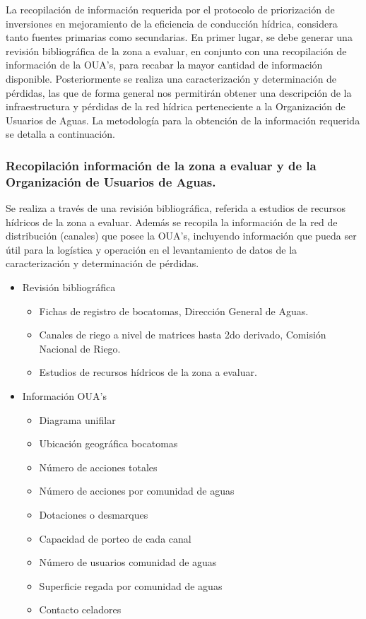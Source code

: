 \documentclass[]{article}
\begin{document}
La recopilación de información requerida por el protocolo de priorización de inversiones en mejoramiento de la eficiencia de conducción hídrica, considera tanto fuentes primarias como secundarias. En primer lugar, se debe generar una revisión bibliográfica de la zona a evaluar, en conjunto con una recopilación de información de la OUA's, para recabar la mayor cantidad de información disponible. Posteriormente se realiza una caracterización y determinación de pérdidas, las que de forma general nos permitirán obtener una descripción de la infraestructura y pérdidas de la red hídrica perteneciente a la Organización de Usuarios de Aguas. La metodología para la obtención de la información requerida se detalla a continuación.

\subsubsection{Recopilación información de la zona a evaluar y de la Organización de Usuarios de Aguas.}

Se realiza a través de una revisión bibliográfica, referida a estudios de recursos hídricos de la zona a evaluar. Además se recopila la información de la red de distribución (canales) que posee la OUA's, incluyendo información que pueda ser útil para la logística y operación en el levantamiento de datos de la caracterización y determinación de pérdidas.

\begin{itemize}
	\item Revisión bibliográfica
	\begin{itemize}	
		\item Fichas de registro de bocatomas, Dirección General de Aguas.
		\item Canales de riego a nivel de matrices hasta 2do derivado, Comisión Nacional de Riego.
		\item Estudios de recursos hídricos de la zona a evaluar.
	\end{itemize}
	\item Información OUA's
	\begin{itemize}	
		\item Diagrama unifilar
		\item Ubicación geográfica bocatomas
		\item Número de acciones totales
		\item Número de acciones por comunidad de aguas
		\item Dotaciones o desmarques
		\item Capacidad de porteo de cada canal
		\item Número de usuarios comunidad de aguas
		\item Superficie regada por comunidad de aguas
		\item Contacto celadores
	\end{itemize}
\end{itemize}	
\end{document}
